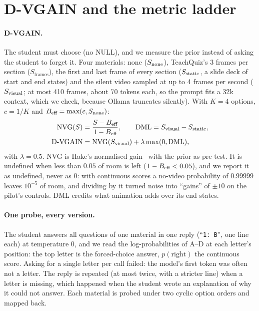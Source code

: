 \section{D-VGAIN and the metric ladder}\label{sec:ladder}


\paragraph{D-VGAIN.} The student must choose (no NULL), and we measure the prior instead of asking the student to
forget it. Four materials: none ($S_{\text{none}}$), TeachQuiz's 3 frames per section ($S_{\text{frames}}$), the first and
last frame of every section ($S_{\text{static}}$, a slide deck of start and end states) and the silent video sampled at up to 4
frames per second ($S_{\text{visual}}$; at most 410 frames, about 70 tokens each, so the prompt fits a 32k context, which we
check, because Ollama truncates silently). With $K = 4$ options, $c = 1/K$ and $B_{\text{eff}} = \max(c, S_{\text{none}})$:
\begin{align}
  \mathrm{NVG}(S) &= \frac{S - B_{\text{eff}}}{1 - B_{\text{eff}}}, \qquad \mathrm{DML} = S_{\text{visual}} - S_{\text{static}},\\
  \text{D-VGAIN} &= \mathrm{NVG}(S_{\text{visual}}) + \lambda \max(0, \mathrm{DML}),
\end{align}
with $\lambda = 0.5$. NVG is Hake's normalised gain~\cite{hake1998} with the prior as pre-test. It is undefined when
less than $0.05$ of room is left ($1 - B_{\text{eff}} < 0.05$), and we report it as undefined, never as 0: with continuous
scores a no-video probability of $0.99999$ leaves $10^{-5}$ of room, and dividing by it turned noise into ``gains'' of
$\pm 10$ on the pilot's controls. DML credits what animation adds over its end states.

\paragraph{One probe, every version.} The student answers all questions of one material in one reply (``\texttt{1: B}'',
one line each) at temperature 0, and we read the log-probabilities of A--D at each letter's position: the top letter
is the forced-choice answer, $p(\text{right})$ the continuous score. Asking for a single letter per call failed:
the model's first token was often not a letter. The reply is repeated (at most twice, with a stricter line) when a
letter is missing, which happened when the student wrote an explanation of why it could not answer. Each material is
probed under two cyclic option orders and mapped back.

